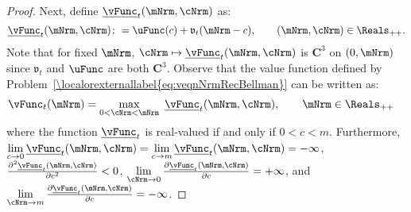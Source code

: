 \documentclass[\econtexRoot/BufferStockTheory]{subfiles}
\begin{document}
\begin{proof}
Next, define $\underline{\vFunc}_{t}(\mNrm,\cNrm)$ as:
%
%
\begin{equation*}
  \underline{\vFunc}_{t}(\mNrm,\cNrm)\colon =\uFunc(c)+\mathfrak{v}_{t}(\mNrm-c), \qquad (\mNrm,\cNrm)\in \Reals_{++}.
\end{equation*}
%
Note that for fixed $\mNrm$, $\cNrm \mapsto \underline{\vFunc}_{t}(\mNrm,\cNrm)$ is $\mathbf{C}^{3}$ on $(0, \mNrm)$ since $\mathfrak{v}_{t}$ and $\uFunc$ are both
$\mathbf{C}^{3}$.
Observe that the value function defined
by Problem~\eqref{\localorexternallabel{eq:veqnNrmRecBellman}} can be written as:
%
\begin{equation*}\begin{gathered}\begin{aligned}
      \vFunc_{t}(\mNrm) & =  \max_{0<\cNrm<\mNrm}~\underline{\vFunc}_{t}(\mNrm,\cNrm), \qquad \mNrm\in \Reals_{++}
    \end{aligned}\end{gathered}\end{equation*}
%
where the function $\underline{\vFunc}_{t}$ is real-valued if and only if $0<c<m$.
Furthermore,
$\lim\limits_{c \rightarrow
  0}\underline{\vFunc}_{t}(\mNrm,\cNrm)=\lim\limits_{c\rightarrow m} \underline{\vFunc}_{t}(\mNrm,\cNrm)=-\infty $, $\frac{\partial ^{2}\underline{\vFunc}_{t}(\mNrm,\cNrm)}{\partial c^{2}}%
<0$, $\lim\limits_{\cNrm \rightarrow 0}\frac{\partial \underline{\vFunc}_{t}(\mNrm,\cNrm)}{\partial c}%
=+\infty $, and $\lim\limits_{\cNrm\rightarrow m} \frac{\partial \underline{\vFunc}_{t}(\mNrm,\cNrm)}{%
  \partial c}=-\infty $.


\end{proof}
\end{document}
